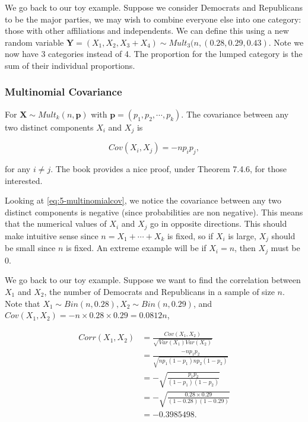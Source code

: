 \documentclass[
]{book}
\begin{document}
We go back to our toy example. Suppose we consider Democrats and Republicans to be the major parties, we may wish to combine everyone else into one category: those with other affiliations and independents. We can define this using a new random variable \(\boldsymbol{Y} = (X_1, X_2, X_3+X_4) \sim Mult_3(n,(0.28,0.29,0.43)\). Note we now have 3 categories instead of 4. The proportion for the lumped category is the sum of their individual proportions.

\hypertarget{multinomial-covariance}{%
\subsubsection{Multinomial Covariance}\label{multinomial-covariance}}

For \(\boldsymbol{X} \sim Mult_k(n, \boldsymbol{p})\) with \(\boldsymbol{p} = (p_1,p_2, \cdots, p_k)\). The covariance between any two distinct components \(X_i\) and \(X_j\) is

\begin{equation} 
Cov(X_i, X_j) = -n p_i p_j,
\label{eq:5-multinomialcov}
\end{equation}

for any \(i \neq j\). The book provides a nice proof, under Theorem 7.4.6, for those interested.

Looking at \eqref{eq:5-multinomialcov}, we notice the covariance between any two distinct components is negative (since probabilities are non negative). This means that the numerical values of \(X_i\) and \(X_j\) go in opposite directions. This should make intuitive sense since \(n = X_1 + \cdots + X_k\) is fixed, so if \(X_i\) is large, \(X_j\) should be small since \(n\) is fixed. An extreme example will be if \(X_i = n\), then \(X_j\) must be 0.

We go back to our toy example. Suppose we want to find the correlation between \(X_1\) and \(X_2\), the number of Democrats and Republicans in a sample of size \(n\). Note that \(X_1 \sim Bin(n,0.28), X_2 \sim Bin(n,0.29)\), and \(Cov(X_1,X_2) = -n \times 0.28 \times 0.29 = 0.0812n\),

\[
\begin{split}
Corr(X_1,X_2) &= \frac{Cov(X_1,X_2)}{\sqrt{Var(X_1) Var(X_2)}}\\
 &= \frac{-n p_1 p_2}{\sqrt{n p_1 (1-p_1) n p_2 (1-p_2)}} \\
 &= -\sqrt{\frac{p_1 p_2}{(1-p_1)(1-p_2)}} \\
 &= -\sqrt{\frac{0.28 \times 0.29}{(1-0.28)(1-0.29)}} \\
 &= -0.3985498.
\end{split}
\]
\end{document}
